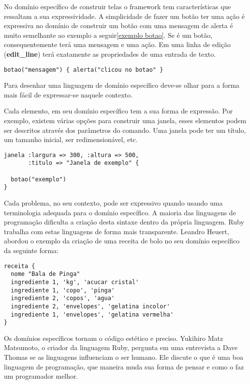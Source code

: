 \documentclass[espaco=simples,appendix=Name]{abnt}
\begin{document}
No domínio específico de construir telas o framework tem características que ressaltam a sua expressividade. A simplicidade de fazer um botão ter uma ação é expressiva no domínio de construir um botão com uma mensagem de alerta é muito semelhante ao exemplo a seguir\ref{exemplo botao}. Se é um botão, consequentemente terá uma mensagem e uma ação.  Em uma linha de edição (\textbf{edit\_line}) terá exatamente as propriedades de uma entrada de texto. 


\begin{lstlisting}[label=exemplo botao, caption=Simplicidade do botão]
botao("mensagem") { alerta("clicou no botao" } 
\end{lstlisting}


Para desenhar uma linguagem de domínio específico deve-se olhar para a forma mais fácil de expressar-se naquele contexto.

Cada elemento, em seu domínio específico tem a sua forma de expressão. Por exemplo,  existem várias opções para construir uma janela, esses elementos podem ser descritos através dos parâmetros do comando. Uma janela pode ter um título, um tamanho inicial, ser redimensionável, etc.

\begin{lstlisting}[label=exemplo janela, caption=Expressividade da construção de uma janela]
janela :largura => 300, :altura => 500, 
       :titulo => "Janela de exemplo" {

  botao("exemplo")
}
\end{lstlisting}


Cada problema, no seu contexto, pode ser expressivo quando usando uma terminologia adequada para o domínio específico. A maioria das linguagens de programação dificulta a criação desta sintaxe dentro da própria linguagem. Ruby trabalha com estas linguagens de forma mais transparente. Leandro Heuert\cite{dslLeandro}, abordou o exemplo da criação de uma receita de bolo no seu domínio específico da seguinte forma: 

\begin{lstlisting}[label=exemplo receita, caption=Expressividade de uma receita no seu domínio específico\cite{dslLeandro}]
receita {
  nome "Bala de Pinga"
  ingrediente 1, 'kg', 'acucar cristal'
  ingrediente 1, 'copo', 'pinga'
  ingrediente 2, 'copos', 'agua'
  ingrediente 2, 'envelopes', 'gelatina incolor'
  ingrediente 1, 'envelopes', 'gelatina vermelha'
}
\end{lstlisting}

Os domínios específicos tornam o código estético e preciso. Yukihiro Matz Matsumoto, o criador da linguagem Ruby, pergunta em uma entrevista a Dave Thomas se as linguagens influenciam o ser humano. Ele discute o que é uma boa linguagem de programação, que maneira muda sua forma de pensar e como o faz um programador melhor.
\end{document}
